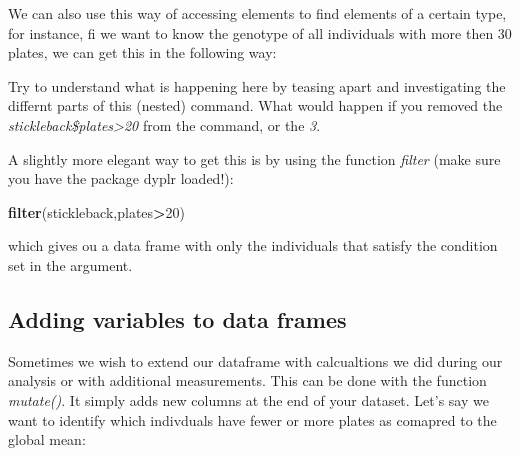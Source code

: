 \documentclass[]{article}
\newenvironment{Shaded}{\begin{snugshade}}{\end{snugshade}}
\newcommand{\DataTypeTok}[1]{\textcolor[rgb]{0.13,0.29,0.53}{#1}}
\newcommand{\DecValTok}[1]{\textcolor[rgb]{0.00,0.00,0.81}{#1}}
\newcommand{\KeywordTok}[1]{\textcolor[rgb]{0.13,0.29,0.53}{\textbf{#1}}}
\newcommand{\NormalTok}[1]{#1}
\newcommand{\OperatorTok}[1]{\textcolor[rgb]{0.81,0.36,0.00}{\textbf{#1}}}
\newcommand{\StringTok}[1]{\textcolor[rgb]{0.31,0.60,0.02}{#1}}
\begin{document}
We can also use this way of accessing elements to find elements of a
certain type, for instance, fi we want to know the genotype of all
individuals with more then 30 plates, we can get this in the following
way:

\begin{Shaded}
\end{Shaded}

Try to understand what is happening here by teasing apart and
investigating the differnt parts of this (nested) command. What would
happen if you removed the \emph{stickleback\$plates\textgreater{}20}
from the command, or the \emph{3}.

A slightly more elegant way to get this is by using the function
\emph{filter} (make sure you have the package dyplr loaded!):

\begin{Shaded}
\begin{Highlighting}[]
\KeywordTok{filter}\NormalTok{(stickleback,plates}\OperatorTok{>}\DecValTok{20}\NormalTok{)}
\end{Highlighting}
\end{Shaded}

which gives ou a data frame with only the individuals that satisfy the
condition set in the argument.

\hypertarget{adding-variables-to-data-frames}{%
\subsection{Adding variables to data
frames}\label{adding-variables-to-data-frames}}

Sometimes we wish to extend our dataframe with calcualtions we did
during our analysis or with additional measurements. This can be done
with the function \emph{mutate()}. It simply adds new columns at the end
of your dataset. Let's say we want to identify which indivduals have
fewer or more plates as comapred to the global mean:

\begin{Shaded}
\end{Shaded}
\end{document}
